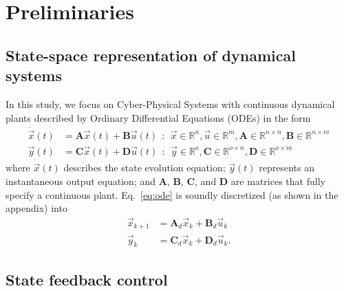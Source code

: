 \documentclass[runningheads,a4paper]{llncs}
\newcommand{\mat}[1]{\boldsymbol{#1}}
\begin{document}
\section{Preliminaries}
\label{sec:preliminaries}

\subsection{State-space representation of dynamical systems}
\label{ssec:ssrepresentation}

In this study, we focus on Cyber-Physical Systems with continuous 
dynamical plants described by Ordinary Differential Equations (ODEs) 
in the form
%
\begin{align}
\label{eq:ode}
\dot{\vec{x}}(t)&=\mat{A}\vec{x}(t)+\mat{B}\vec{u}(t)\ \ :\ \ \vec{x} \in \mathbb{R}^{n}, \vec{u} \in \mathbb{R}^m, \mat{A} \in \mathbb{R}^{n \times n},\mat{B} \in \mathbb{R}^{n \times m}\\
\vec{y}(t)&=\mat{C}\vec{x}(t)+\mat{D}\vec{u}(t)\ \ :\ \ \vec{y} \in \mathbb{R}^{o}, \mat{C} \in \mathbb{R}^{o \times n}, \mat{D}  \in \mathbb{R}^{o \times m}\nonumber
\end{align}
\noindent where $\dot{\vec{x}}(t)$ describes the state evolution equation; 
$\vec{y}(t)$ represents an instantaneous output equation; and $\mat{A}$, $\mat{B}$, $\mat{C}$, and $\mat{D}$ are matrices that fully specify 
a continuous plant. Eq.~\eqref{eq:ode} is soundly discretized 
(as shown in the appendix) into
%
\begin{align}
\label{eq:plant}
\vec{x}_{k+1}&=\mat{A}_d\vec{x}_k+\mat{B}_d\vec{u}_k\\
\vec{y}_k&=\mat{C}_d\vec{x}_k+\mat{D}_d\vec{u}_k .\nonumber
\end{align}
%

\subsection{State feedback control}
\label{ssec:statefeedbackcontrol}
\end{document}
